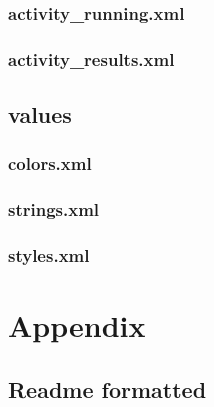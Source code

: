 \documentclass[11pt, titlepage ]{article}
\begin{document}
\subsubsection{activity\_running.xml}

\subsubsection{activity\_results.xml}


\clearpage

\subsection{values}
\subsubsection{colors.xml}


\subsubsection{strings.xml}


\subsubsection{styles.xml}


\section{Appendix}
\subsection{Readme formatted} \label{readmeFormatted}

\end{document}
